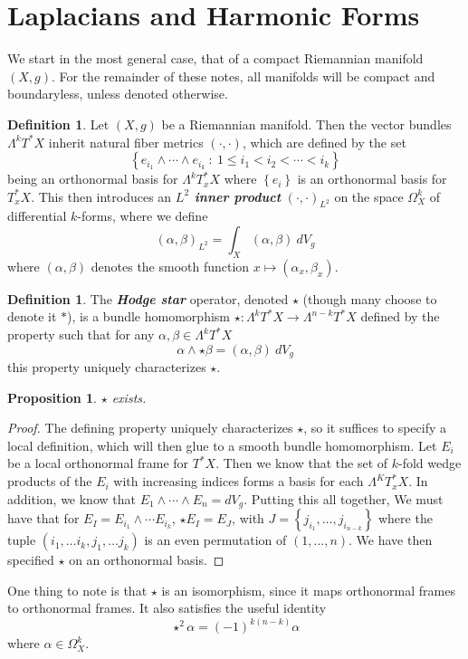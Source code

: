 \documentclass[psamsfonts, 12pt]{amsart}
\newtheorem{prop}[thm]{Proposition}
\theoremstyle{definition}
\newtheorem{defn}[thm]{Definition}
\theoremstyle{remark}
\newcommand{\ib}[1]{\textbf{\textit{#1}}}
\newcommand{\set}[1]{\left\lbrace #1 \right\rbrace}
\begin{document}
\section{Laplacians and Harmonic Forms}
%
We start in the most general case, that of a compact Riemannian manifold $(X,g)$. For
the remainder of these notes, all manifolds will be compact and boundaryless,
unless denoted otherwise.
%
\begin{defn}
Let $(X,g)$ be a Riemannian manifold. Then the vector bundles $\Lambda^kT^*X$
inherit natural fiber metrics $(\cdot,\cdot)$, which are defined by the set
\[
\set{e_{i_1} \wedge \cdots \wedge e_{i_k} ~:~ 1 \leq i_1 < i_2 < \cdots < i_k}
\]
being an orthonormal basis for $\Lambda^kT^*_xX$ where $\set{e_i}$ is an orthonormal
basis for $T^*_xX$. This then introduces an \ib{$L^2$ inner product}
$(\cdot,\cdot)_{L^2}$ on the space $\Omega^k_X$ of differential $k$-forms, where we
define
\[
(\alpha,\beta)_{L^2} = \int_X (\alpha,\beta)~dV_g
\]
where $(\alpha,\beta)$ denotes the smooth function $x \mapsto (\alpha_x, \beta_x)$.
\end{defn}
%
\begin{defn}
The \ib{Hodge star} operator, denoted $\star$ (though many choose to denote it $*$), is
a bundle homomorphism $\star : \Lambda^kT^*X \to \Lambda^{n-k}T^*X$ defined by the
property such that for any $\alpha,\beta \in \Lambda^kT^*X$
\[
\alpha \wedge \star\beta = (\alpha,\beta)~dV_g
\]
this property uniquely characterizes $\star$.
\end{defn}
%
\begin{prop}
$\star$ exists.
\end{prop}
%
\begin{proof}
The defining property uniquely characterizes $\star$, so it suffices to specify a
local definition, which will then glue to a smooth bundle homomorphism. Let $E_i$ be a
local orthonormal frame for $T^*X$. Then we know that the set of $k$-fold wedge products
of the $E_i$ with increasing indices forms a basis for each $\Lambda^KT^*_xX$. In
addition, we know that $E_1 \wedge \cdots \wedge E_n = dV_g$. Putting this all together,
We must have that for $E_I = E_{i_1} \wedge \cdots E_{i_k}$, $\star E_I = E_J$, with
$J = \set{j_{i_1}, \ldots ,j_{i_{n-k}}}$ where the tuple
$(i_1, \ldots i_k,j_1, \ldots j_k)$ is an even permutation of $(1, \ldots ,n)$. We have
then specified $\star$ on an orthonormal basis.
\end{proof}
%
One thing to note is that $\star$ is an isomorphism, since it maps orthonormal frames
to orthonormal frames. It also satisfies the useful identity
\[
\star^2\alpha = (-1)^{k(n-k)}\alpha
\]
where $\alpha \in \Omega^k_X$. \\
\end{document}
